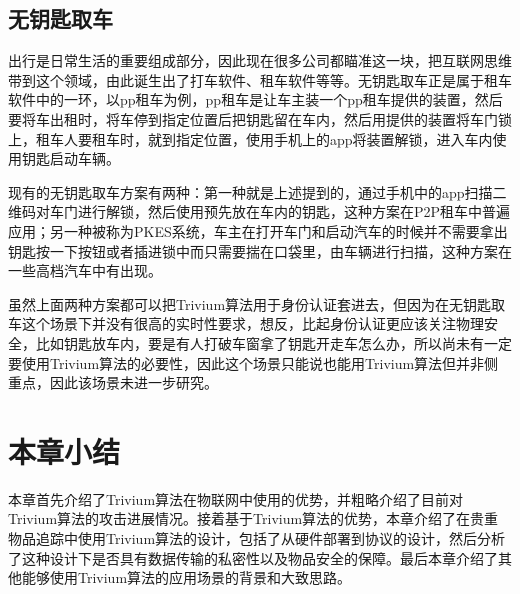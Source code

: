 \subsection{无钥匙取车}

出行是日常生活的重要组成部分，因此现在很多公司都瞄准这一块，把互联网思维带到这个领域，由此诞生出了打车软件、租车软件等等。无钥匙取车正是属于租车软件中的一环，以pp租车为例，pp租车是让车主装一个pp租车提供的装置，然后要将车出租时，将车停到指定位置后把钥匙留在车内，然后用提供的装置将车门锁上，租车人要租车时，就到指定位置，使用手机上的app将装置解锁，进入车内使用钥匙启动车辆。

现有的无钥匙取车方案有两种：第一种就是上述提到的，通过手机中的app扫描二维码对车门进行解锁，然后使用预先放在车内的钥匙，这种方案在P2P租车中普遍应用；另一种被称为PKES系统，车主在打开车门和启动汽车的时候并不需要拿出钥匙按一下按钮或者插进锁中而只需要揣在口袋里，由车辆进行扫描，这种方案在一些高档汽车中有出现。

虽然上面两种方案都可以把Trivium算法用于身份认证套进去，但因为在无钥匙取车这个场景下并没有很高的实时性要求，想反，比起身份认证更应该关注物理安全，比如钥匙放车内，要是有人打破车窗拿了钥匙开走车怎么办，所以尚未有一定要使用Trivium算法的必要性，因此这个场景只能说也能用Trivium算法但并非侧重点，因此该场景未进一步研究。

\section{本章小结}

本章首先介绍了Trivium算法在物联网中使用的优势，并粗略介绍了目前对Trivium算法的攻击进展情况。接着基于Trivium算法的优势，本章介绍了在贵重物品追踪中使用Trivium算法的设计，包括了从硬件部署到协议的设计，然后分析了这种设计下是否具有数据传输的私密性以及物品安全的保障。最后本章介绍了其他能够使用Trivium算法的应用场景的背景和大致思路。
